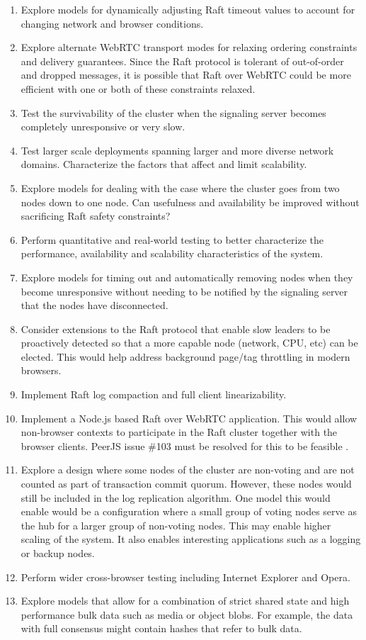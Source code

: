 \documentclass[conference,compsoc]{./IEEEtran/IEEEtran}
\begin{document}
\begin{enumerate}
\item Explore models for dynamically adjusting Raft timeout values to
    account for changing network and browser conditions.
\item Explore alternate WebRTC transport modes for relaxing ordering
    constraints and delivery guarantees. Since the Raft protocol is
    tolerant of out-of-order and dropped messages, it is possible that
    Raft over WebRTC could be more efficient with one or both of these
    constraints relaxed.
\item Test the survivability of the cluster when the signaling server
    becomes completely unresponsive or very slow.
\item Test larger scale deployments spanning larger and more diverse
    network domains. Characterize the factors that affect and limit
    scalability.
\item Explore models for dealing with the case where the cluster goes
    from two nodes down to one node. Can usefulness and availability
    be improved without sacrificing Raft safety constraints?
\item Perform quantitative and real-world testing to better
    characterize the performance, availability and scalability
    characteristics of the system.
\item Explore models for timing out and automatically removing nodes
    when they become unresponsive without needing to be notified by
    the signaling server that the nodes have disconnected.
\item Consider extensions to the Raft protocol that enable slow
    leaders to be proactively detected so that a more capable node
    (network, CPU, etc) can be elected. This would help address
    background page/tag throttling in modern browsers.
\item Implement Raft log compaction and full client linearizability.
\item Implement a Node.js based Raft over WebRTC application. This
    would allow non-browser contexts to participate in the Raft
    cluster together with the browser clients. PeerJS issue \#103 must
    be resolved for this to be feasible \cite{peerjs:103}.
\ifdefined\OPTIONAL
\item Explore a design where some nodes of the cluster are non-voting
    and are not counted as part of transaction commit quorum. However,
    these nodes would still be included in the log replication
    algorithm. One model this would enable would be a configuration
    where a small group of voting nodes serve as the hub for a larger
    group of non-voting nodes. This may enable higher scaling of the
    system. It also enables interesting applications such as a logging
    or backup nodes.
\item Perform wider cross-browser testing including Internet Explorer
    and Opera.
\item Explore models that allow for a combination of strict shared
    state and high performance bulk data such as media or object
    blobs. For example, the data with full consensus might contain
    hashes that refer to bulk data.
\fi
\end{enumerate}
\end{document}
